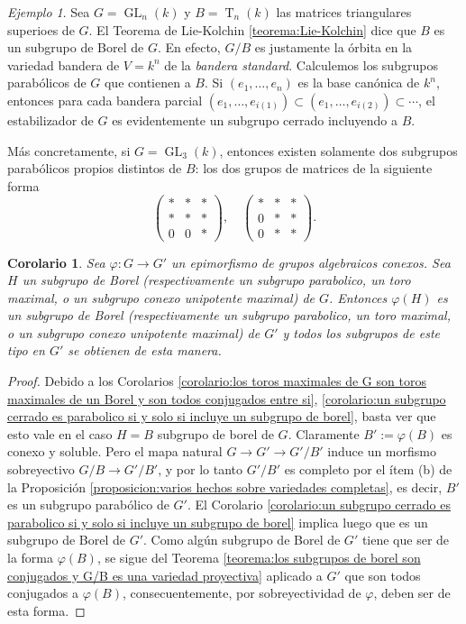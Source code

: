 \documentclass[spanish,10pt]{amsart}
\newtheorem{corollary}[theorem]{Corolario}
\theoremstyle{definition}
\theoremstyle{remark}
\newtheorem{example}[theorem]{Ejemplo}
\numberwithin{equation}{section}
\begin{document}
\begin{example}
Sea $G = \operatorname{GL}_n (k)$ y $B = \operatorname{T}_n (k)$ las matrices triangulares superioes de $G$. El Teorema de Lie-Kolchin \ref{teorema:Lie-Kolchin} dice que $B$ es un subgrupo de Borel de $G$. En efecto, $G/B$ es justamente la órbita en la variedad bandera de $V = k^n$ de la \textit{bandera standard}. Calculemos los subgrupos parabólicos de $G$ que contienen a $B$. Si $(e_1, \ldots, e_n)$ es la base canónica de $k^n$, entonces para cada bandera parcial $(e_1, \ldots, e_{i(1)}) \subset (e_1, \ldots, e_{i(2)}) \subset \cdots$, el estabilizador de $G$ es evidentemente un subgrupo cerrado incluyendo a $B$.

Más concretamente, si $G = \operatorname{GL}_3 (k)$, entonces existen solamente dos subgrupos parabólicos propios distintos de $B$: los dos grupos de matrices de la siguiente forma
\[
    \begin{pmatrix}
    * &* & * \\
    * & * & * \\
    0 & 0 & *
    \end{pmatrix}, \quad
    \begin{pmatrix}
    * &* & * \\
    0 & * & * \\
    0 & * & *
    \end{pmatrix}.
\]
\end{example}

\begin{corollary}\label{corolario:los epimorfismos preservan subgrupos}
Sea $\varphi : G \to G'$ un epimorfismo de grupos algebraicos conexos. Sea $H$ un subgrupo de Borel (respectivamente un subgrupo parabolico, un toro maximal, o un subgrupo conexo unipotente maximal) de $G$. Entonces $\varphi (H)$ es un subgrupo  de Borel (respectivamente un subgrupo parabolico, un toro maximal, o un subgrupo conexo unipotente maximal) de $G'$ y todos los subgrupos de este tipo en $G'$ se obtienen de esta manera.
\end{corollary}
\begin{proof}
Debido a los Corolarios \ref{corolario:los toros maximales de G son toros maximales de un Borel y son todos conjugados entre si}, \ref{corolario:un subgrupo cerrado es parabolico si y solo si incluye un subgrupo de borel}, basta ver que esto vale en el caso $H = B$ subgrupo de borel de $G$. Claramente $B' := \varphi (B)$ es conexo y soluble. Pero el mapa natural $G \to G' \to G'/B'$ induce un morfismo sobreyectivo $G/B \to G'/B'$, y por lo tanto $G'/B'$ es completo por el ítem (b) de la Proposición \ref{proposicion:varios hechos sobre variedades completas}, es decir, $B'$ es un subgrupo parabólico de $G'$. El Corolario \ref{corolario:un subgrupo cerrado es parabolico si y solo si incluye un subgrupo de borel} implica luego que es un subgrupo de Borel de $G'$. Como algún subgrupo de Borel de $G'$ tiene que ser de la forma $\varphi (B)$, se sigue del Teorema \ref{teorema:los subgrupos de borel son conjugados y G/B es una variedad proyectiva} aplicado a $G'$ que son todos conjugados a $\varphi (B)$, consecuentemente, por sobreyectividad de $\varphi$, deben ser de esta forma.
\end{proof}
\end{document}
